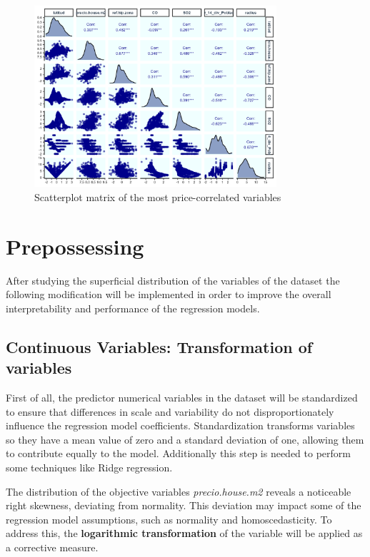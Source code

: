 \documentclass[11pt]{report} %
\begin{document}
\begin{figure}[h!] 
    \centering       
    \includegraphics[width=0.8\textwidth]{Images/scatterplot_matrix.png} %
    \caption{Scatterplot matrix of the most price-correlated variables}
    \label{fig:scatterplot_matrix} 
\end{figure}









\chapter{Prepossessing}\label{chap:preprocessing}

After studying the superficial distribution of the variables of the dataset the following modification will be implemented in order to improve the overall interpretability and performance of the regression models.

\section{Continuous Variables: Transformation of variables}

First of all, the predictor numerical variables in the dataset will be standardized to ensure that differences in scale and variability do not disproportionately influence the regression model coefficients. Standardization transforms variables so they have a mean value of zero and a standard deviation of one, allowing them to contribute equally to the model. Additionally this step is needed to perform some techniques like Ridge regression.

The distribution of the objective variables \textit{precio.house.m2} reveals a noticeable right skewness, deviating from normality. This deviation may impact some of the regression model assumptions, such as normality and homoscedasticity. To address this, the \textbf{logarithmic transformation} of the variable will be applied as a corrective measure.
\end{document}

